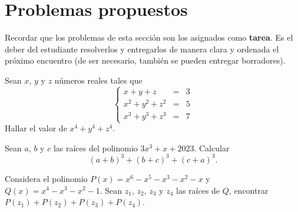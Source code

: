 \section{Problemas propuestos}

Recordar que los problemas de esta sección son los asignados como \textbf{tarea}.
Es el deber del estudiante resolverlos y entregarlos de manera clara y ordenada el próximo encuentro
(de ser necesario, también se pueden entregar borradores).

\begin{section-problem}
    Sean $x$, $y$ y $z$ números reales tales que
    \[
        \left\{
        \begin{array}{rcl}
            x + y + z & =& 3\\
            x^2 + y^2 + z^2 & =& 5\\
            x^3 + y^3 + z^3 & =& 7
        \end{array}
        \right.
    \]
    Hallar el valor de $x^4 + y^4 + z^4$.
\end{section-problem}

\begin{section-problem}
    Sean $a$, $b$ y $c$ las raíces del polinomio $3x^3 + x + 2023$.
    Calcular \[(a + b)^3 + (b + c)^3 + (c + a)^3.\]
\end{section-problem}

\begin{section-problem}
    Considera el polinomio $P(x) = x^6 - x^5 - x^3 - x^2 - x$ y $Q(x) = x^4 - x^3 - x^2 - 1$.
    Sean $z_1$, $z_2$, $z_3$ y $z_4$ las raíces de $Q$, encontrar $P(z_1) + P(z_2) + P(z_3) + P(z_4)$.
\end{section-problem}